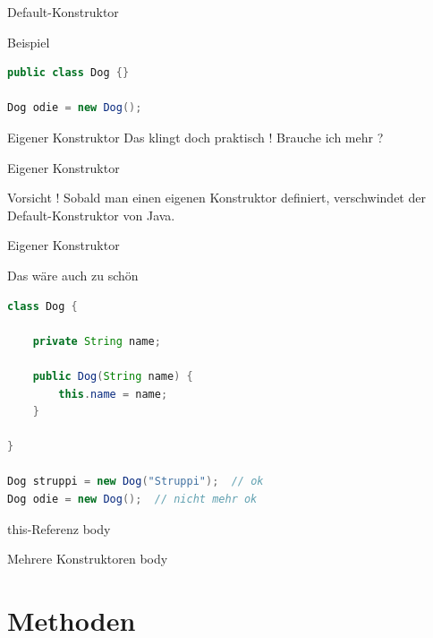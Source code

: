 \documentclass[18pt]{beamer}
\begin{document}
\begin{frame}[fragile]{Default-Konstruktor}
    \begin{exampleblock}{Beispiel}
        \begin{lstlisting}[language=Java]
public class Dog {}

Dog odie = new Dog();
        \end{lstlisting}

    \end{exampleblock}

\end{frame}


\begin{frame}{Eigener Konstruktor}
    Das klingt doch praktisch ! Brauche ich mehr ?
\end{frame}

\begin{frame}{Eigener Konstruktor}
    \begin{alertblock}{Vorsicht !}
        Sobald man einen eigenen Konstruktor definiert, verschwindet der Default-Konstruktor von Java.
    \end{alertblock}
\end{frame}

\begin{frame}[fragile]{Eigener Konstruktor}
    \begin{exampleblock}{Das wäre auch zu schön}
        \begin{lstlisting}[language=Java]
class Dog {

    private String name;

    public Dog(String name) {
        this.name = name;
    }

}

Dog struppi = new Dog("Struppi");  // ok
Dog odie = new Dog();  // nicht mehr ok
        \end{lstlisting}

    \end{exampleblock}


\end{frame}


\begin{frame}{this-Referenz}
    body
\end{frame}

\begin{frame}{Mehrere Konstruktoren}
    body
\end{frame}

\section{Methoden}
\end{document}
